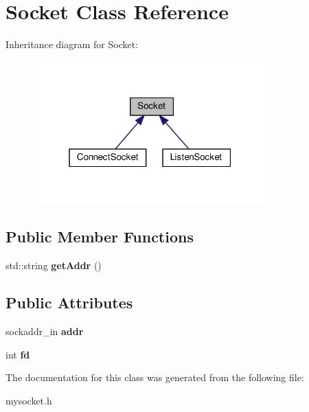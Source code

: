 \hypertarget{classSocket}{}\section{Socket Class Reference}
\label{classSocket}


Inheritance diagram for Socket\+:\nopagebreak
\begin{figure}[H]
\begin{center}
\leavevmode
\includegraphics[width=256pt]{classSocket__inherit__graph}
\end{center}
\end{figure}
\subsection*{Public Member Functions}
\begin{DoxyCompactItemize}
\item 
\mbox{\label{classSocket_a016ecd3f448e9d0b9cc850e67b69edfd}} 
std\+::string {\bfseries get\+Addr} ()
\end{DoxyCompactItemize}
\subsection*{Public Attributes}
\begin{DoxyCompactItemize}
\item 
\mbox{\label{classSocket_a378d057b3f318732cfeec23fce1155ea}} 
sockaddr\+\_\+in {\bfseries addr}
\item 
\mbox{\label{classSocket_ac7873ea787c01454ce02925367130f23}} 
int {\bfseries fd}
\end{DoxyCompactItemize}


The documentation for this class was generated from the following file\+:\begin{DoxyCompactItemize}
\item 
mysocket.\+h\end{DoxyCompactItemize}
